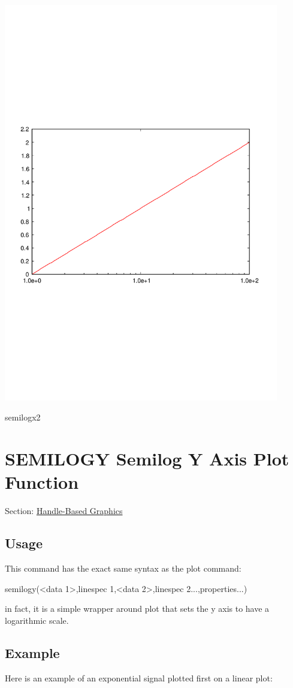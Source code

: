  
\begin{DoxyImage}
\includegraphics[width=12cm]{semilogx2}
\caption{semilogx2}
\end{DoxyImage}
 \hypertarget{handle_semilogy}{}\section{S\-E\-M\-I\-L\-O\-G\-Y Semilog Y Axis Plot Function}\label{handle_semilogy}
Section\-: \hyperlink{sec_handle}{Handle-\/\-Based Graphics} \hypertarget{vtkwidgets_vtkxyplotwidget_Usage}{}\subsection{Usage}\label{vtkwidgets_vtkxyplotwidget_Usage}
This command has the exact same syntax as the {\ttfamily plot} command\-: \begin{DoxyVerb}  semilogy(<data 1>,{linespec 1},<data 2>,{linespec 2}...,properties...)
\end{DoxyVerb}
 in fact, it is a simple wrapper around {\ttfamily plot} that sets the y axis to have a logarithmic scale. \hypertarget{variables_struct_Example}{}\subsection{Example}\label{variables_struct_Example}
Here is an example of an exponential signal plotted first on a linear plot\-:


